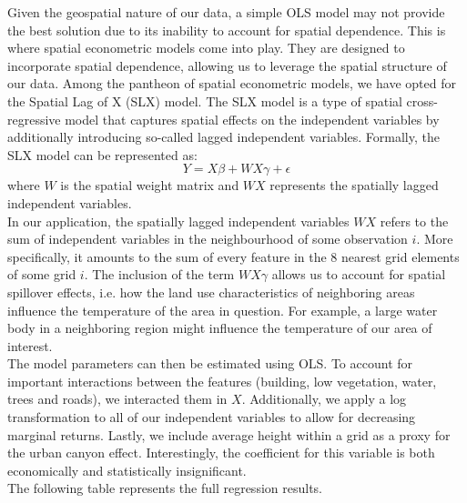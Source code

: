 \documentclass[12pt]{article}
\begin{document}
Given the geospatial nature of our data, a simple OLS model may not provide the best solution due to its inability to account for spatial dependence. This is where spatial econometric models come into play. They are designed to incorporate spatial dependence, allowing us to leverage the spatial structure of our data. Among the pantheon of spatial econometric models, we have opted for the Spatial Lag of X (SLX) model. The SLX model is a type of spatial cross-regressive model that captures spatial effects on the independent variables by additionally introducing so-called lagged independent variables.
Formally, the SLX model can be represented as:
\begin{equation}
Y = X\beta + WX\gamma + \epsilon
\end{equation}
where $W$ is the spatial weight matrix and $WX$ represents the spatially lagged independent variables.\\
In our application, the spatially lagged independent variables $WX$ refers to the sum of independent variables in the neighbourhood of some observation $i$. More specifically, it amounts to the sum of every feature in the 8 nearest grid elements of some grid $i$. The inclusion of the term $WX\gamma$ allows us to account for spatial spillover effects, i.e. how the land use characteristics of neighboring areas influence the temperature of the area in question. For example, a large water body in a neighboring region might influence the temperature of our area of interest.\\
The model parameters can then be estimated using OLS. To account for important interactions between the features (building, low vegetation, water, trees and roads), we interacted them in $X$. Additionally, we apply a log transformation to all of our independent variables to allow for decreasing marginal returns. Lastly, we include average height within a grid as a proxy for the urban canyon effect. Interestingly, the coefficient for this variable is both economically and statistically insignificant.\\
The following table represents the full regression results.
\end{document}
